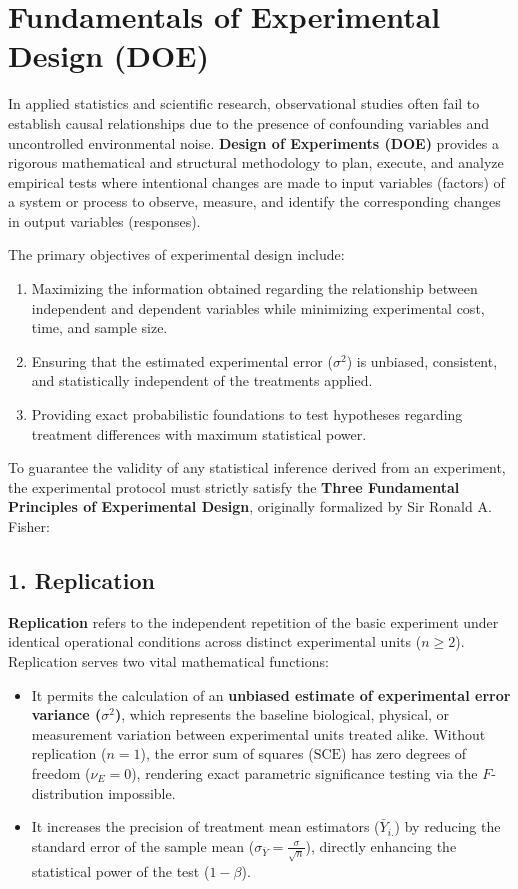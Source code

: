 \section{Fundamentals of Experimental Design (DOE)}

In applied statistics and scientific research, observational studies often fail to establish causal relationships due to the presence of confounding variables and uncontrolled environmental noise. \textbf{Design of Experiments (DOE)} provides a rigorous mathematical and structural methodology to plan, execute, and analyze empirical tests where intentional changes are made to input variables (factors) of a system or process to observe, measure, and identify the corresponding changes in output variables (responses).

The primary objectives of experimental design include:
\begin{enumerate}
	\item Maximizing the information obtained regarding the relationship between independent and dependent variables while minimizing experimental cost, time, and sample size.
	\item Ensuring that the estimated experimental error ($\sigma^2$) is unbiased, consistent, and statistically independent of the treatments applied.
	\item Providing exact probabilistic foundations to test hypotheses regarding treatment differences with maximum statistical power.
\end{enumerate}

To guarantee the validity of any statistical inference derived from an experiment, the experimental protocol must strictly satisfy the \textbf{Three Fundamental Principles of Experimental Design}, originally formalized by Sir Ronald A. Fisher:

\subsection{1. Replication}
\textbf{Replication} refers to the independent repetition of the basic experiment under identical operational conditions across distinct experimental units ($n \geq 2$). Replication serves two vital mathematical functions:
\begin{itemize}
	\item It permits the calculation of an \textbf{unbiased estimate of experimental error variance ($\sigma^2$)}, which represents the baseline biological, physical, or measurement variation between experimental units treated alike. Without replication ($n=1$), the error sum of squares ($\text{SCE}$) has zero degrees of freedom ($\nu_E = 0$), rendering exact parametric significance testing via the $F$-distribution impossible.
	\item It increases the precision of treatment mean estimators ($\bar{Y}_{i.}$) by reducing the standard error of the sample mean ($\sigma_{\bar{Y}} = \frac{\sigma}{\sqrt{n}}$), directly enhancing the statistical power of the test ($1 - \beta$).
\end{itemize}

